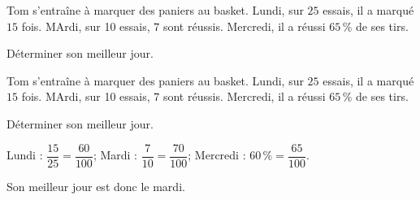 \begin{exercice*}
    Tom s'entraîne à marquer des paniers au basket. Lundi, sur $25$ essais, il a marqué $15$ fois. MArdi, sur 10 essais, $7$ sont réussis. Mercredi, il a réussi $65\,\%$ de ses tirs.

    Déterminer son meilleur jour.
\end{exercice*}
\begin{corrige}
    Tom s'entraîne à marquer des paniers au basket. Lundi, sur $25$ essais, il a marqué $15$ fois. MArdi, sur 10 essais, $7$ sont réussis. Mercredi, il a réussi $65\,\%$ de ses tirs.

    Déterminer son meilleur jour.

    {\red 
    Lundi : $\dfrac{15}{25}=\dfrac{60}{100}$; \hfill Mardi : $\dfrac{7}{10}=\dfrac{70}{100}$; \hfill Mercredi : $60\,\%=\dfrac{65}{100}$.

    Son meilleur jour est donc le mardi.
    }
\end{corrige}

